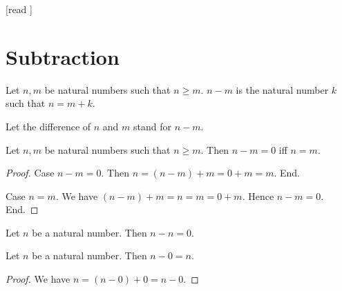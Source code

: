 \documentclass[10pt]{article}
\begin{document}
  \begin{imports}
    \begin{forthel}
      [read ]
    \end{forthel}
  \end{imports}


  \section*{Subtraction}

  \begin{forthel}
    \begin{definition}[id=ARITHMETIC_05_8878757276286976,printid]
      Let $n, m$ be natural numbers such that $n \geq m$.
      $n - m$ is the natural number $k$ such that $n = m + k$.
    \end{definition}

    Let the difference of $n$ and $m$ stand for $n - m$.
  \end{forthel}

  \begin{forthel}
    \begin{proposition}[id=ARITHMETIC_05_874271710642176,printid]
      Let $n, m$ be natural numbers such that $n \geq m$.
      Then $n - m = 0$ iff $n = m$.
    \end{proposition}
    \begin{proof}
      Case $n - m = 0$.
        Then $n
          = (n - m) + m
          = 0 + m
          = m$.
      End.

      Case $n = m$.
        We have $(n - m) + m
          = n
          = m
          = 0 + m$.
        Hence $n - m = 0$.
      End.
    \end{proof}
  \end{forthel}

  \begin{forthel}
    \begin{corollary}[id=ARITHMETIC_05_8457713057005568,printid]
      Let $n$ be a natural number.
      Then $n - n = 0$.
    \end{corollary}
  \end{forthel}

  \begin{forthel}
    \begin{proposition}[id=ARITHMETIC_05_8518521570983936,printid]
      Let $n$ be a natural number.
      Then $n - 0 = n$.
    \end{proposition}
    \begin{proof}
      We have $n
        = (n - 0) + 0
        = n - 0$.
    \end{proof}
  \end{forthel}
\end{document}
